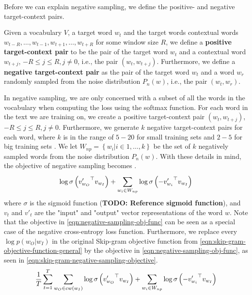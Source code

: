 Before we can explain negative sampling, we define the positive- and negative target-context pairs.
\begin{definition}
Given a vocabulary $V$, a target word $w_t$ and the target words contextual words $w_{t-R}, \ldots, w_{t-1}, w_{t+1}, \ldots, w_{t+R}$ for some window size $R$, we define a \textbf{positive target-context pair} to be the pair of the target word $w_t$ and a contextual word $w_{t+j}$, $-R \leq j \leq R, j \neq 0$, i.e., the pair $\left( w_t, w_{t+j} \right)$. Furthermore, we define a \textbf{negative target-context pair} as the pair of the target word $w_t$ and a word $w_r$ randomly sampled from the noise distribution $P_n(w)$, i.e., the pair $\left( w_t, w_r \right)$.
\end{definition}

In negative sampling, we are only concerned with a subset of all the words in the vocabulary when computing the loss using the softmax function. For each word in the text we are training on, we create a positive target-context pair $\left( w_t, w_{t+j} \right)$, $-R \leq j \leq R, j \neq 0$. Furthermore, we generate $k$ negative target-context pairs for each word, where $k$ is in the range of $5-20$ for small training sets and $2-5$ for big training sets \cite{mikolov2013b}. We let $W_{np} = \left \{ w_i | i \in 1, \ldots, k \right \}$ be the set of $k$ negatively sampled words from the noise distribution $P_n(w)$. With these details in mind, the objective of negative sampling becomes \cite{mikolov2013b, rong2016word2vec}.
\begin{align}
    \log \sigma \left( {v'_{w_O}}^\top v_{w_I} \right) + \sum\limits_{w_i \in W_{np}}^{} \log \sigma \left( -{v'_{w_i}}^\top v_{w_I} \right)
    \label{eqn:negative-sampling-obj-func}
\end{align}
where $\sigma$ is the sigmoid function (\textbf{TODO: Reference sigmoid function}), and $v_t$ and $v'_t$ are the "input" and "output" vector representations of the word $w$. Note that the objective in \cref{eqn:negative-sampling-obj-func} can be seen as a special case of the negative cross-entropy loss function. Furthermore, we replace every $\log p(w_O | w_I)$ in the original Skip-gram objective function from \cref{eqn:skip-gram-objective-function-general} by the objective in \cref{eqn:negative-sampling-obj-func}, as seen in \cref{eqn:skip-gram-negative-sampling-objective}.
\begin{align}
    \frac{1}{T} \sum\limits_{t=1}^{T} \sum\limits_{w_O \in cw(w_I)}^{} \log \sigma \left( {v'_{w_O}}^\top v_{w_I} \right) + \sum\limits_{w_i \in W_{np}}^{} \log \sigma \left( -{v'_{w_i}}^\top v_{w_I} \right)
    \label{eqn:skip-gram-negative-sampling-objective}
\end{align}

